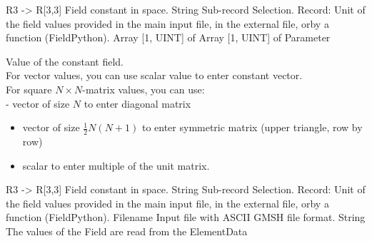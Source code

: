 \begin{RecordType}
	{}
	{} %
	{} %
	{} %
	{{{R3 -{\textgreater} R[3,3] Field constant in space.}}}
		\KeyItem
			{}
			{{String}}
			{\textrangle}
			{} %
			{{{Sub-record Selection.}}}
		\KeyItem
			{}
			{{Record}{: }}
			{\textrangle}
			{} %
			{{{Unit of the field values provided in the main input file, in the external file, orby a function (FieldPython).}}}
		\KeyItem
			{}
			{{Array [1, UINT] of }{Array [1, UINT] of }{Parameter}}
			{\textrangle}
			{} %
			{{{{Value of the constant field.}\\{
For vector values, you can use scalar value to enter constant vector.}\\{
For square }{$N\times N$}{-matrix values, you can use:}\\{
 - vector of size }{$N$}{ to enter diagonal matrix}
}
\begin{itemize}
\item {vector of size }{$\frac12N(N+1)$}{ to enter symmetric matrix (upper triangle, row by row)}
\item {scalar to enter multiple of the unit matrix.}
\end{itemize}
}}
\end{RecordType}
\begin{RecordType}
	{}
	{} %
	{} %
	{} %
	{{{R3 -{\textgreater} R[3,3] Field constant in space.}}}
		\KeyItem
			{}
			{{String}}
			{\textrangle}
			{} %
			{{{Sub-record Selection.}}}
		\KeyItem
			{}
			{{Record}{: }}
			{\textrangle}
			{} %
			{{{Unit of the field values provided in the main input file, in the external file, orby a function (FieldPython).}}}
		\KeyItem
			{}
			{{Filename}}
			{\textrangle}
			{} %
			{{{Input file with ASCII GMSH file format.}}}
		\KeyItem
			{}
			{{String}}
			{\textrangle}
			{} %
			{{{The values of the Field are read from the }\ttfamily {\$}ElementData}}
\end{RecordType}
